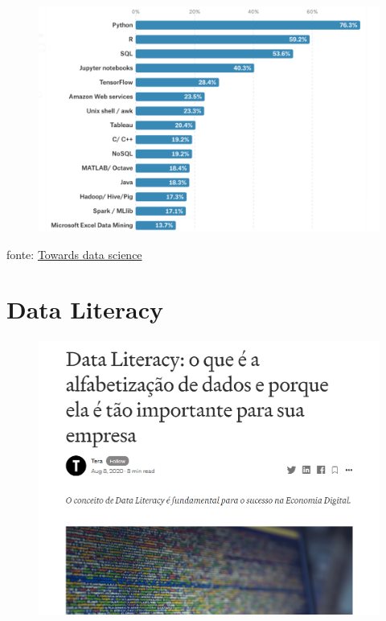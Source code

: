 \documentclass[
]{article}
\begin{document}
\begin{figure}

{\centering \includegraphics[width=0.9\linewidth,height=0.7\textheight]{imagem/linguagens} 

}

\caption{ }\label{fig:linguagens, figures-side}
\end{figure}

fonte:
\href{https://towardsdatascience.com/training-your-staff-in-data-science-heres-how-to-pick-the-right-programming-language-dda349354b18}{Towards
data science}

\hypertarget{data-literacy}{%
\section{Data Literacy}\label{data-literacy}}

\begin{figure}

{\centering \includegraphics[width=0.7\linewidth,height=0.7\textheight]{imagem/data-literacy} 

}

\caption{ }\label{fig:literacy, figures-side}
\end{figure}
\end{document}
